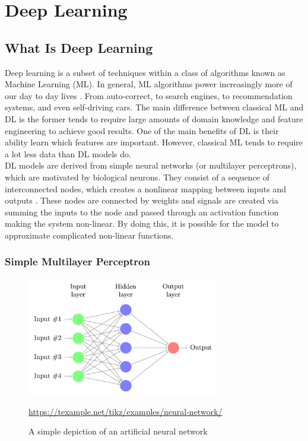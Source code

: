 \section{Deep Learning}
\subsection{What Is Deep Learning}
Deep learning is a subset of techniques within a class of algorithms known as Machine Learning (ML). In general, ML algorithms power increasingly more of our day to day lives \cite{lecun2015deep}. From auto-correct, to search engines, to recommendation systems, and even self-driving cars. The main difference between classical ML and DL is the former tends to require large amounts of domain knowledge and feature engineering to achieve good results. One of the main benefits of DL is their ability learn which features are important. However, classical ML tends to require a lot less data than DL models do. \\

 DL models are derived from simple neural networks (or multilayer perceptrons), which are motivated by biological neurons. They consist of a sequence of interconnected nodes, which creates a nonlinear mapping between inputs and outputs \cite{gardner1998artificial}. These nodes are connected by weights and signals are created via summing the inputs to the node and passed through an activation function making the system non-linear. By doing this, it is possible for the model to approximate complicated non-linear functions.
 
 \subsubsection*{Simple Multilayer Perceptron}
 
 \begin{figure}[h]
 	\includegraphics[width=0.75\textwidth]{../Figures/neural-network.png}
 	\caption[An ANN]{A simple depiction of an artificial neural network} \url{https://texample.net/tikz/examples/neural-network/}
 	\label{fig:appendix-mlp}
 \end{figure}
 
